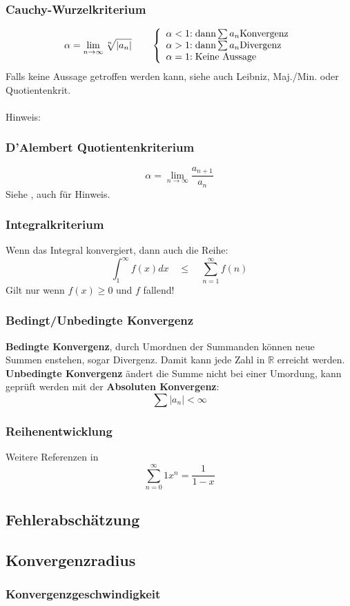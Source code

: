 \subsubsection{Cauchy-Wurzelkriterium}\label{W-Kriterium}
\[\alpha = \lim\limits_{n \rightarrow \infty}{\sqrt[n]{\left|a_n\right|}}\qquad
\left\lbrace
\begin{array}{r@{}l}
	\alpha < 1 &: \text{dann} \sum a_n \text{Konvergenz} \\
	\alpha > 1 &: \text{dann} \sum a_n \text{Divergenz} \\
	\alpha = 1 &: \text{Keine Aussage} \\
\end{array}\right. \]
Falls keine Aussage getroffen werden kann, siehe auch Leibniz, Maj./Min. oder Quotientenkrit.
\\ \\
\noindent Hinweis:

\subsubsection{D'Alembert Quotientenkriterium}
\[\alpha = \lim\limits_{n \rightarrow \infty}{\frac{a_{n+1}}{a_n}}\]
Siehe , auch für Hinweis.

\subsubsection{Integralkriterium}
Wenn das Integral konvergiert, dann auch die Reihe:
\[\int_{1}^{\infty}f(x)dx \quad\leq\quad \sum_{n=1}^{\infty}f(n)\]
Gilt nur wenn $f(x) \geq 0$ und $f$ fallend!

\subsubsection{Bedingt/Unbedingte Konvergenz}
\textbf{Bedingte Konvergenz}, durch Umordnen der Summanden können neue Summen enstehen, sogar Divergenz. Damit kann jede Zahl in $\mathbb{R}$ erreicht werden.\\
\textbf{Unbedingte Konvergenz} ändert die Summe nicht bei einer Umordung, kann geprüft werden mit der \textbf{Absoluten Konvergenz}:
\[\sum\left|a_n\right| < \infty\]

\subsubsection{Reihenentwicklung}
Weitere Referenzen in 
\[\sum_{n = 0}^{\infty}1x^n = \frac{1}{1-x}\]

\subsection{Fehlerabschätzung}

\subsection{Konvergenzradius}

\subsubsection{Konvergenzgeschwindigkeit}
\todo{}